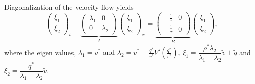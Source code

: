 \documentclass[a4paper, 10pt, conference]{ieeeconf}      %
\begin{document}
Diagonalization of the velocity-flow yields
{\footnotesize
\begin{equation} \label{vqlindiag}
\begin{pmatrix}
\xi_1 \\ \xi_2
\end{pmatrix}_t + 
\underset{A}{
	\underbrace{
	\begin{pmatrix}
		\lambda_1 & 0 \\
		0 & \lambda_2
	\end{pmatrix} 
	}
}
\begin{pmatrix}
\xi_1 \\ \xi_2
\end{pmatrix}_x = 
\underset{B}{
	\underbrace{
	\begin{pmatrix}
		-\frac{1}{\tau} & 0 \\
		-\frac{1}{\tau} & 0
	\end{pmatrix}}
}
\begin{pmatrix}
\xi_1 \\ \xi_2
\end{pmatrix},
\end{equation}
}
where the eigen values, {\footnotesize$\lambda_1 = v^{*}$ and $\lambda_2 = v^{*} + \frac{q^{*}}{v^{*}} V'(\frac{q^{*}}{v^{*}})$, $\xi_1 = \dfrac{\rho^*\lambda_2}{\lambda_1 - \lambda_2}\tilde{v} + \tilde{q}$} and {\footnotesize$\xi_2 = \dfrac{q^*}{\lambda_1 - \lambda_2}\tilde{v}$}.\\
\end{document}
